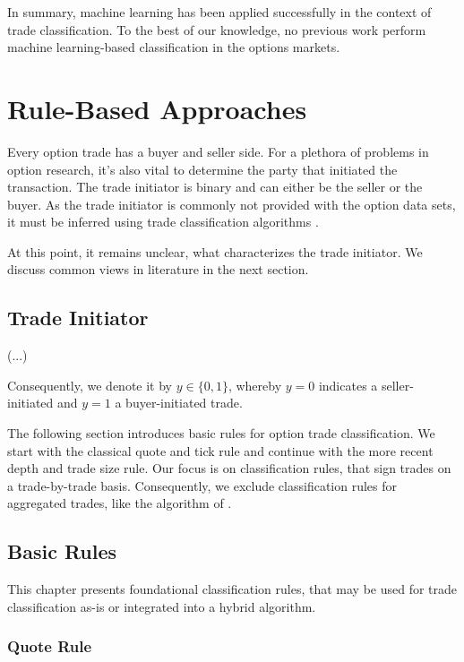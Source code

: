 In summary, machine learning has been applied successfully in the context of trade classification. To the best of our knowledge, no previous work perform machine learning-based classification in the options markets.

\newpage
\section{Rule-Based Approaches}\label{sec:rule-based-approaches}

Every option trade has a buyer and seller side. For a plethora of problems in option research, it's also vital to determine the party that initiated the transaction. The trade initiator is binary and can either be the seller or the buyer. As the trade initiator is commonly not provided with the option data sets, it must be inferred using trade classification algorithms \autocite[][453]{easleyOptionVolumeStock1998}.

At this point, it remains unclear, what characterizes the trade initiator. We discuss common views in literature in the next section.

\subsection{Trade Initiator}\label{sec:trade-initiator}

(...)

Consequently, we denote it by $y \in \{0,1\}$, whereby $y=0$ indicates a seller-initiated and $y=1$ a buyer-initiated trade.

The following section introduces basic rules for option trade classification. We start with the classical quote and tick rule and continue with the more recent depth and trade size rule. Our focus is on classification rules, that sign trades on a trade-by-trade basis. Consequently, we exclude classification rules for aggregated trades, like the  algorithm of \textcite[][1466--1468]{easleyFlowToxicityLiquidity2012}.

\subsection{Basic Rules}\label{sec:basic-rules}

This chapter presents foundational classification rules, that may be used for trade classification as-is or integrated into a hybrid algorithm.

\subsubsection{Quote Rule}\label{sec:quote-rule}

